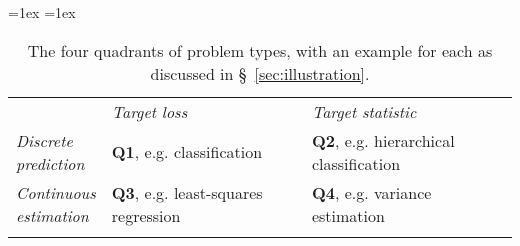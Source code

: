 \documentclass[11pt]{article} %
\begin{document}
\begin{table}[h!]
  \begin{center}
    \aboverulesep=1ex
    \belowrulesep=1ex
    \begin{tabular}{p{12ex}ll}
      & \emph{Target loss}  & \emph{Target statistic}\\
      \cmidrule[1pt]{2-3}
      \parbox{12ex}{\emph{Discrete \\ prediction}} & \textbf{Q1}, e.g. classification  & \textbf{Q2}, e.g. hierarchical classification\\ 
      \parbox{12ex}{\emph{Continuous \\ estimation}} & \textbf{Q3}, e.g. least-squares regression & \textbf{Q4}, e.g. variance estimation\\ 
      \\
    \end{tabular}
    \caption{The four quadrants of problem types, with an example for each as discussed in \S~\ref{sec:illustration}.}
    \label{tab:quadrants}
  \end{center}
\end{table}
\end{document}

